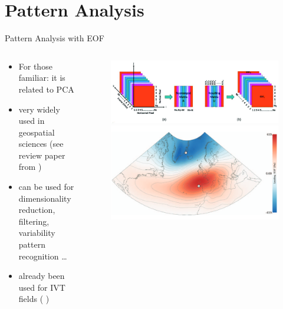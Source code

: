\section{Pattern Analysis}

\begin{frame}{Pattern Analysis with EOF}
  \begin{columns}
    \begin{column}{.5\textwidth}
      \begin{itemize}
        \item For those familiar: it is related to PCA
        \item very widely used in geospatial sciences (see review paper from \citeauthor{hannachi_empirical_2007} \cite{hannachi_empirical_2007})
        \item can be used for dimensionality reduction, filtering, variability pattern recognition \dots
        \item already been used for IVT fields (\citeauthor{ayantobo_integrated_2022} \cite{ayantobo_integrated_2022})
      \end{itemize} 
      
    \end{column}
    \begin{column}{.5\textwidth}
    \begin{figure}[t]
      \centering
      \includegraphics[width=.9 \columnwidth]{imglib/eof_matrix_decomp.png}
      \includegraphics[width=.7\columnwidth]{imglib/nao_eof_index.png}
    \end{figure}

    \end{column}
    
  \end{columns}
\end{frame}

